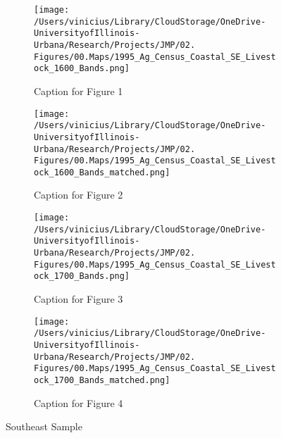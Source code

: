 \documentclass[11pt]{article}
\begin{document}
\begin{landscape}
  \begin{figure}[htbp]
    \centering
    \begin{subfigure}[b]{0.65\textwidth}
        \centering
        \texttt{[image: /Users/vinicius/Library/CloudStorage/OneDrive-UniversityofIllinois-Urbana/Research/Projects/JMP/02. Figures/00.Maps/1995\_Ag\_Census\_Coastal\_SE\_Livestock\_1600\_Bands.png]}
        \caption{Caption for Figure 1}
        \label{fig:fig1}
    \end{subfigure}
    \hfill
    \begin{subfigure}[b]{0.65\textwidth}
        \centering
        \texttt{[image: /Users/vinicius/Library/CloudStorage/OneDrive-UniversityofIllinois-Urbana/Research/Projects/JMP/02. Figures/00.Maps/1995\_Ag\_Census\_Coastal\_SE\_Livestock\_1600\_Bands\_matched.png]}
        \caption{Caption for Figure 2}
        \label{fig:fig2}
    \end{subfigure}

    \vspace{0.1cm} %

    \begin{subfigure}[b]{0.65\textwidth}
        \centering
        \texttt{[image: /Users/vinicius/Library/CloudStorage/OneDrive-UniversityofIllinois-Urbana/Research/Projects/JMP/02. Figures/00.Maps/1995\_Ag\_Census\_Coastal\_SE\_Livestock\_1700\_Bands.png]}
        \caption{Caption for Figure 3}
        \label{fig:fig3}
    \end{subfigure}
    \hfill
    \begin{subfigure}[b]{0.65\textwidth}
        \centering
        \texttt{[image: /Users/vinicius/Library/CloudStorage/OneDrive-UniversityofIllinois-Urbana/Research/Projects/JMP/02. Figures/00.Maps/1995\_Ag\_Census\_Coastal\_SE\_Livestock\_1700\_Bands\_matched.png]}
        \caption{Caption for Figure 4}
        \label{fig:fig4}
    \end{subfigure}

    \vspace{1cm}

    \caption{Southeast Sample}
    \label{fig:robustness_SE_distance_cutoff}
    
\end{figure}
\end{landscape}

\clearpage 

\end{document}
